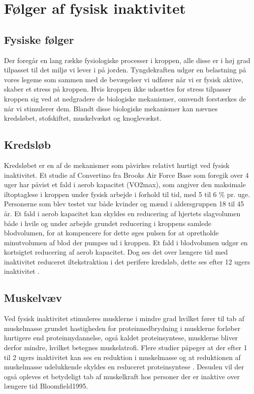 \section{Følger af fysisk inaktivitet}

\subsection{Fysiske følger}

Der foregår en lang række fysiologiske processer i kroppen, alle disse er i høj grad tilpasset til det miljø vi lever i på jorden. Tyngdekraften udgør en belastning på vores legeme som sammen med de bevægelser vi udfører når vi er fysisk aktive, skaber et stress på kroppen. Hvis kroppen ikke udsættes for stress tilpasser kroppen sig ved at nedgradere de biologiske mekanismer, omvendt forstærkes de når vi stimulerer dem. Blandt disse biologiske mekanismer kan nævnes kredsløbet, stofskiftet, muskelvækst og knoglevækst.\citep{motionsraad2007}

\subsection{Kredsløb}
Kredsløbet er en af de mekanismer som påvirkes relativt hurtigt ved fysisk inaktivitet. Et studie af Convertino fra Brooks Air Force Base som foregik over 4 uger har påvist et fald i aerob kapacitet (VO2max), som angiver den maksimale iltoptaglese i kroppen under fysisk arbejde i forhold til tid, med 5 til 6 \% pr. uge. Personerne som blev testet var både kvinder og mænd i aldersgruppen 18 til 45 år. Et fald i aerob kapacitet kan skyldes en reducering af hjertets slagvolumen både i hvile og under arbejde grundet reducering i kroppens samlede blodvolumen, for at kompencere for dette øges pulsen for at opretholde minutvolumen af blod der pumpes ud i kroppen. Et fald i blodvolumen udgør en kortsigtet reducering af aerob kapacitet.\citep{Convertino1995} Dog ses det over længere tid med inaktivitet reduceret iltekstraktion i det perifere kredsløb, dette ses efter 12 ugers inaktivitet \citep{Coyle1985}.

\subsection{Muskelvæv}
Ved fysisk inaktivitet stimuleres musklerne i mindre grad hvilket fører til tab af muskelmasse grundet hastigheden for proteinnedbrydning i musklerne forløber hurtigere end proteinnydannelse, også kaldet proteinsyntese, musklerne bliver derfor mindre, hvilket betegnes muskelatrofi. Flere studier påpeger at der efter 1 til 2 ugers inaktivitet kan ses en reduktion i muskelmasse og at reduktionen af muskelmasse udelukkende skyldes en reduceret proteinsyntese \citep{Douglas2006}. \citep{Bloomsfield1995} Desuden vil der også opleves et betydeligt tab af muskelkraft hos personer der er inaktive over længere tid {Bloomfield1995}. 

